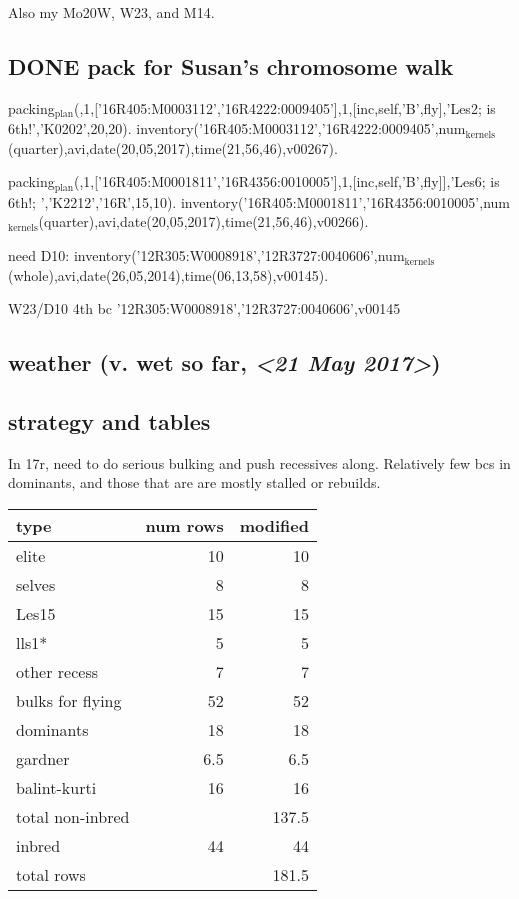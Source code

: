 \documentclass[11pt]{article}
\begin{document}
Also my Mo20W, W23, and M14.


\subsection{{\bfseries\sffamily DONE} pack for Susan's chromosome walk}
\label{sec-1-4}


packing$_{\text{plan}}$(,1,['16R405:M0003112','16R4222:0009405'],1,[inc,self,'B',fly],'Les2; is 6th!','K0202',20,20).
inventory('16R405:M0003112','16R4222:0009405',num$_{\text{kernels}}$(quarter),avi,date(20,05,2017),time(21,56,46),v00267).

packing$_{\text{plan}}$(,1,['16R405:M0001811','16R4356:0010005'],1,[inc,self,'B',fly]],'Les6; is 6th!; ','K2212','16R',15,10).
inventory('16R405:M0001811','16R4356:0010005',num$_{\text{kernels}}$(quarter),avi,date(20,05,2017),time(21,56,46),v00266).


need D10:
inventory('12R305:W0008918','12R3727:0040606',num$_{\text{kernels}}$(whole),avi,date(26,05,2014),time(06,13,58),v00145).

W23/D10 4th bc
'12R305:W0008918','12R3727:0040606',v00145





\subsection{weather (v. wet so far, \textit{<21 May 2017>})}
\label{sec-1-5}



\subsection{strategy and tables}
\label{sec-1-6}

In 17r, need to do serious bulking and push recessives along.  Relatively
few bcs in dominants, and those that are are mostly stalled or rebuilds.



\begin{center}
\begin{tabular}{lrr}
type & num rows & modified\\
\hline
elite & 10 & 10\\
selves & 8 & 8\\
Les15 & 15 & 15\\
lls1* & 5 & 5\\
other recess & 7 & 7\\
bulks for flying & 52 & 52\\
dominants & 18 & 18\\
gardner & 6.5 & 6.5\\
balint-kurti & 16 & 16\\
total non-inbred &  & 137.5\\
inbred & 44 & 44\\
total rows &  & 181.5\\
\end{tabular}
\end{center}
\end{document}
